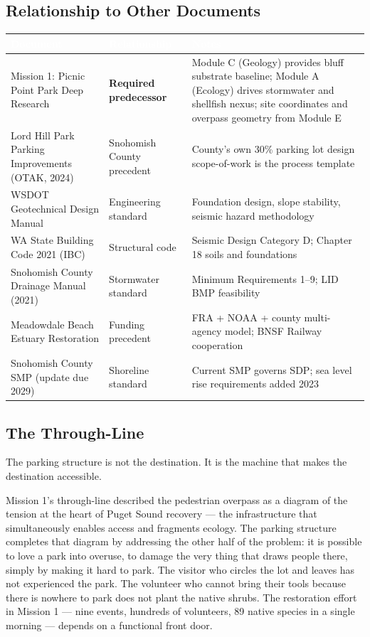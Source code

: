 \documentclass[11pt,letterpaper]{article}
\newcommand{\tableheader}[1]{\textbf{\sffamily\textcolor{white}{#1}}}
\begin{document}
\subsection{Relationship to Other Documents}

\begin{center}
\begin{tabularx}{\textwidth}{L{4cm}L{2.5cm}X}
\toprule
{}
\tableheader{Document} & \tableheader{Relationship} & \tableheader{Notes} \\
\midrule
Mission 1: Picnic Point Park Deep Research & \textbf{Required predecessor} & Module C (Geology) provides bluff substrate baseline; Module A (Ecology) drives stormwater and shellfish nexus; site coordinates and overpass geometry from Module E \\
Lord Hill Park Parking Improvements (OTAK, 2024) & Snohomish County precedent & County's own 30\% parking lot design scope-of-work is the process template \\
WSDOT Geotechnical Design Manual & Engineering standard & Foundation design, slope stability, seismic hazard methodology \\
WA State Building Code 2021 (IBC) & Structural code & Seismic Design Category D; Chapter 18 soils and foundations \\
Snohomish County Drainage Manual (2021) & Stormwater standard & Minimum Requirements 1--9; LID BMP feasibility \\
Meadowdale Beach Estuary Restoration & Funding precedent & FRA + NOAA + county multi-agency model; BNSF Railway cooperation \\
Snohomish County SMP (update due 2029) & Shoreline standard & Current SMP governs SDP; sea level rise requirements added 2023 \\
\bottomrule
\end{tabularx}
\end{center}

\subsection{The Through-Line}

The parking structure is not the destination. It is the machine that makes the destination accessible.

Mission 1's through-line described the pedestrian overpass as a diagram of the tension at the heart of Puget Sound recovery --- the infrastructure that simultaneously enables access and fragments ecology. The parking structure completes that diagram by addressing the other half of the problem: it is possible to love a park into overuse, to damage the very thing that draws people there, simply by making it hard to park. The visitor who circles the lot and leaves has not experienced the park. The volunteer who cannot bring their tools because there is nowhere to park does not plant the native shrubs. The restoration effort in Mission 1 --- nine events, hundreds of volunteers, 89 native species in a single morning --- depends on a functional front door.
\end{document}
